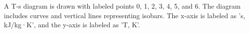 A T-s diagram is drawn with labeled points 0, 1, 2, 3, 4, 5, and 6. The diagram includes curves and vertical lines representing isobars. The x-axis is labeled as 's, kJ/kg·K', and the y-axis is labeled as 'T, K'.